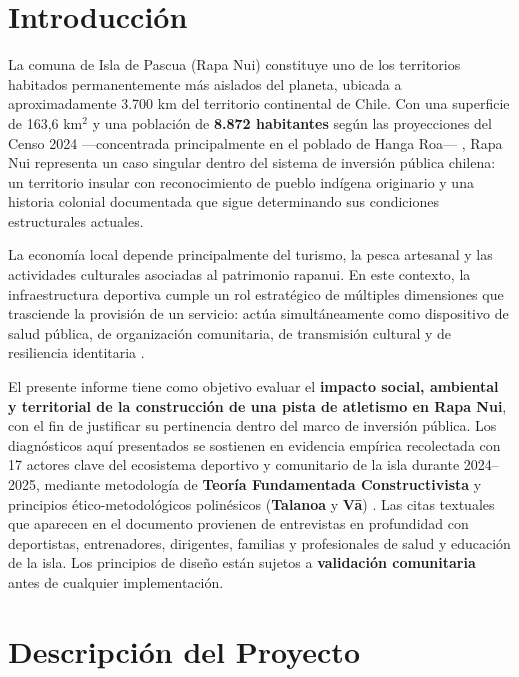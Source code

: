 \documentclass[12pt, a4paper]{article}
\begin{document}
\section{Introducción}

La comuna de Isla de Pascua (Rapa Nui) constituye uno de los territorios habitados
permanentemente más aislados del planeta, ubicada a aproximadamente 3.700 km del
territorio continental de Chile. Con una superficie de 163,6 km$^2$ y una población
de \textbf{8.872 habitantes} según las proyecciones del Censo 2024 ---concentrada principalmente en el poblado de Hanga Roa--- \citep{INE2024},
Rapa Nui representa un caso singular dentro del sistema de inversión pública chilena:
un territorio insular con reconocimiento de pueblo indígena originario y una historia
colonial documentada que sigue determinando sus condiciones estructurales actuales.

La economía local depende principalmente del turismo, la pesca artesanal y las
actividades culturales asociadas al patrimonio rapanui. En este contexto, la
infraestructura deportiva cumple un rol estratégico de múltiples dimensiones que
trasciende la provisión de un servicio: actúa simultáneamente como dispositivo de
salud pública, de organización comunitaria, de transmisión cultural y de resiliencia
identitaria \citep{hauofa1994}.

El presente informe tiene como objetivo evaluar el \textbf{impacto social, ambiental
y territorial de la construcción de una pista de atletismo en Rapa Nui}, con el fin
de justificar su pertinencia dentro del marco de inversión pública. Los diagnósticos
aquí presentados se sostienen en evidencia empírica recolectada con 17 actores clave
del ecosistema deportivo y comunitario de la isla durante 2024--2025, mediante
metodología de \textbf{Teoría Fundamentada Constructivista} \citep{charmaz2014} y
principios ético-metodológicos polinésicos (\textbf{Talanoa} y \textbf{Vā})
\citep{prescott2008, kaili2005}. Las citas textuales que aparecen en el documento
provienen de entrevistas en profundidad con deportistas, entrenadores, dirigentes,
familias y profesionales de salud y educación de la isla. Los principios de diseño
están sujetos a \textbf{validación comunitaria} antes de cualquier implementación.

\section{Descripción del Proyecto}
\end{document}
